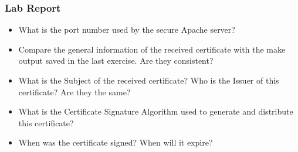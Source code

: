\documentclass[10pt,a4paper]{article}
\numberwithin{equation}{section}
\numberwithin{figure}{section}
\numberwithin{table}{section}
\begin{document}
\subsubsection*{ Lab Report}
\begin{itemize}
	\setlength{\itemindent}{0pt}
	\item What is the port number used by the secure Apache server?
	\item Compare the general information of the received certificate with the make output saved in the last exercise. Are they consistent?
	\item What is the Subject of the received certificate? Who is the Issuer of this certificate? Are they the same?
	\item What is the Certificate Signature Algorithm used to generate and distribute this certificate?
	\item When was the certificate signed? When will it expire?
\end{itemize}
\end{document}
